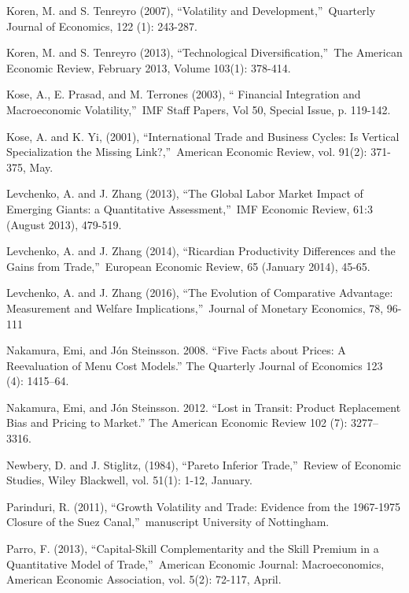 \documentclass[12pt]{article}
\begin{document}
\begin{thebibliography}{99}
\bibitem{} Koren, M. and S. Tenreyro (2007), \textquotedblleft Volatility
and Development,\textquotedblright\ Quarterly Journal of Economics, 122 (1):
243-287.

\bibitem{} Koren, M. and S. Tenreyro (2013), \textquotedblleft Technological
Diversification,\textquotedblright\ The American Economic Review, February
2013, Volume 103(1): 378-414.

\bibitem{} Kose, A., E. Prasad, and M. Terrones (2003), \textquotedblleft
Financial Integration and Macroeconomic Volatility,\textquotedblright\ IMF
Staff Papers, Vol 50, Special Issue, p. 119-142.

\bibitem{} Kose, A. and K. Yi, (2001), \textquotedblleft International Trade
and Business Cycles: Is Vertical Specialization the Missing
Link?,\textquotedblright\ American Economic Review, vol. 91(2): 371-375, May.

\bibitem{} Levchenko, A. and J. Zhang (2013), \textquotedblleft The Global
Labor Market Impact of Emerging Giants: a Quantitative
Assessment,\textquotedblright\ IMF Economic Review, 61:3 (August 2013),
479-519.

\bibitem{} Levchenko, A. and J. Zhang (2014), \textquotedblleft Ricardian
Productivity Differences and the Gains from Trade,\textquotedblright\
European Economic Review, 65 (January 2014), 45-65.

\bibitem{} Levchenko, A. and J. Zhang (2016), \textquotedblleft The
Evolution of Comparative Advantage: Measurement and Welfare
Implications,\textquotedblright\ Journal of Monetary Economics, 78, 96-111

\bibitem{} Nakamura, Emi, and Jón Steinsson. 2008. “Five Facts about Prices: A Reevaluation of Menu Cost Models.” The Quarterly Journal of Economics 123 (4): 1415–64.

\bibitem{} Nakamura, Emi, and Jón Steinsson. 2012. “Lost in Transit: Product Replacement Bias and Pricing to Market.” The American Economic Review 102 (7): 3277–3316.

\bibitem{} Newbery, D. and J. Stiglitz, (1984), \textquotedblleft Pareto
Inferior Trade,\textquotedblright\ Review of Economic Studies, Wiley
Blackwell, vol. 51(1): 1-12, January.

\bibitem{} Parinduri, R. (2011), \textquotedblleft Growth Volatility and
Trade: Evidence from the 1967-1975 Closure of the Suez
Canal,\textquotedblright\ manuscript University of Nottingham.

\bibitem{} Parro, F. (2013), \textquotedblleft Capital-Skill Complementarity
and the Skill Premium in a Quantitative Model of Trade,\textquotedblright\
American Economic Journal: Macroeconomics, American Economic Association,
vol. 5(2): 72-117, April.


\end{thebibliography}
\end{document}
